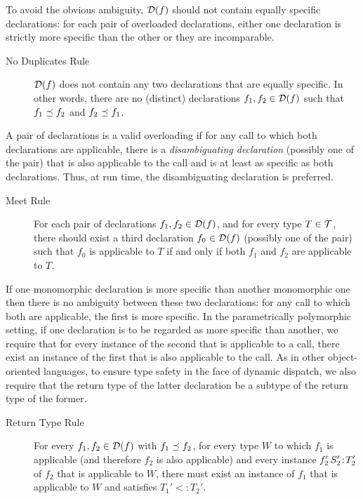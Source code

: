 To avoid the obvious ambiguity, $\mathcal{D}(f)$ should not contain equally specific declarations:
for each pair of overloaded declarations, either one declaration is strictly more specific
than the other or they are incomparable.
\begin{description}
\item[No Duplicates Rule]
$\mathcal{D}(f)$ does not contain any two declarations that are equally specific.
In other words, there are no (distinct) declarations $f_1, f_2 \in \mathcal{D}(f)$ such that $f_1 \preceq f_2$ and $f_2 \preceq f_1$.
\end{description}


A pair of declarations is a valid overloading if for any call to which both declarations are applicable,
there is a {\em disambiguating declaration} (possibly one of the pair)
that is also applicable to the call and is at least as specific as both declarations.
Thus, at run time, the disambiguating declaration is preferred.
\begin{description}
\item[Meet Rule]
For each pair of declarations $f_1, f_2 \in \mathcal{D}(f)$,
and for every type $T \in \mathcal{T}$, there should exist a third declaration $f_0 \in \mathcal{D}(f)$
(possibly one of the pair) such that $f_0$ is applicable to $T$ if and only if
both $f_1$ and $f_2$ are applicable to $T$.
\end{description}



If one monomorphic declaration is more specific than another monomorphic one
then there is no ambiguity between these two declarations:
for any call to which both are applicable, the first is more specific.
In the parametrically polymorphic setting,
if one declaration is to be regarded as more specific than another,
we require that for every instance of the second that is applicable to a call,
there exist an instance of the first that is also applicable to the call.
As in other object-oriented languages, to ensure type safety in the face of dynamic dispatch,
we also require that the return type of the latter declaration be a subtype of the return type of the former.
\begin{description}
\item[Return Type Rule]
For every $f_1, f_2 \in \mathcal{D}(f)$ with $f_1 \preceq f_2$, for every type $W$ to which $f_1$ is applicable
(and therefore $f_2$ is also applicable)
and every instance $\mbox{\ensuremath{{f_2'}\,{S_2'}\!:\!{T_2'}}}$ of $f_2$ that is applicable to $W$,
there must exist an instance  of $f_1$
that is applicable to $W$ and satisfies \mbox{$T_1' <: T_2'$}.
\end{description}
